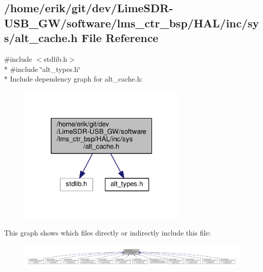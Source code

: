 \subsection{/home/erik/git/dev/\+Lime\+S\+D\+R-\/\+U\+S\+B\+\_\+\+G\+W/software/lms\+\_\+ctr\+\_\+bsp/\+H\+A\+L/inc/sys/alt\+\_\+cache.h File Reference}
\label{alt__cache_8h}
{\ttfamily \#include $<$stdlib.\+h$>$}\\*
{\ttfamily \#include \char`\"{}alt\+\_\+types.\+h\char`\"{}}\\*
Include dependency graph for alt\+\_\+cache.\+h\+:
\nopagebreak
\begin{figure}[H]
\begin{center}
\leavevmode
\includegraphics[width=229pt]{d9/dfb/alt__cache_8h__incl}
\end{center}
\end{figure}
This graph shows which files directly or indirectly include this file\+:
\nopagebreak
\begin{figure}[H]
\begin{center}
\leavevmode
\includegraphics[width=350pt]{d5/d5c/alt__cache_8h__dep__incl}
\end{center}
\end{figure}
